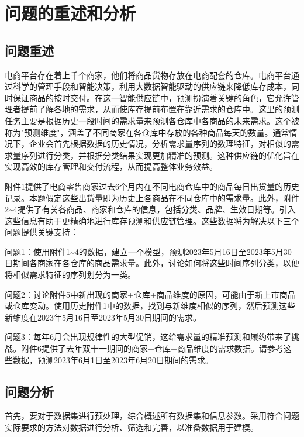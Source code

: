 \documentclass[withoutpreface,bwprint]{cumcmthesis}
\begin{document}
\thispagestyle{empty} %
\tableofcontents 
\newpage

\setcounter{page}{0}
\section{问题的重述和分析}
    \subsection{问题重述}
    电商平台存在着上千个商家，他们将商品货物存放在电商配套的仓库。电商平台通过科学的管理手段和智能决策，利用大数据智能驱动的供应链来降低库存成本，同时保证商品的按时交付。在这一智能供应链中，预测扮演着关键的角色，它允许管理者提前了解各地的需求，从而使库存提前布置在靠近需求的仓库中。这里的预测任务主要是根据历史一段时间的需求量来预测各仓库中各商品的未来需求。这个被称为"预测维度"，涵盖了不同商家在各仓库中存放的各种商品每天的数量。通常情况下，企业会首先根据数据的历史情况，分析需求量序列的数理特征，对相似的需求量序列进行分类，并根据分类结果实现更加精准的预测。这种供应链的优化旨在实现高效的库存管理和交付流程，从而提高整体业务效益。
    
    附件1提供了电商零售商家过去6个月内在不同电商仓库中的商品每日出货量的历史记录。本题假定这些出货量即为历史上各商品在不同仓库中的需求量。此外，附件2\~{}4提供了有关各商品、商家和仓库的信息，包括分类、品牌、生效日期等。引入这些信息有助于更精确地进行库存预测和供应链管理。这些数据将为解决以下三个问题提供关键支持：
    
    问题1：使用附件1\~{}4的数据，建立一个模型，预测2023年5月16日至2023年5月30日期间各商家在各仓库的商品需求量。此外，讨论如何将这些时间序列分类，以便将相似需求特征的序列划分为一类。
    
    问题2：讨论附件5中新出现的商家+仓库+商品维度的原因，可能由于新上市商品或仓库变动。使用历史附件1中的数据，找到与新维度相似的序列，然后预测这些新维度在2023年5月16日至2023年5月30日期间的需求。
     
    问题3：每年6月会出现规律性的大型促销，这给需求量的精准预测和履约带来了挑战。附件6提供了去年双十一期间的商家+仓库+商品维度的需求数据。请参考这些数据，预测2023年6月1日至2023年6月20日期间的需求。
    
    \subsection{问题分析}
    首先，要对于数据集进行预处理，综合概述所有数据集和信息参数。采用符合问题实际要求的方法对数据进行分析、筛选和完善，以准备数据用于建模。
\end{document}
